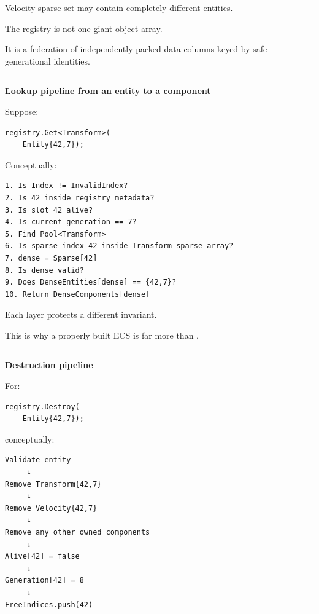 Velocity sparse set may contain completely different entities.

The registry is not one giant object array.

It is a federation of independently packed data columns keyed by safe generational identities.

\begin{center}\rule{0.5\linewidth}{0.5pt}\end{center}

\textbf{Lookup pipeline from an entity to a component}

Suppose:

\begin{verbatim}
registry.Get<Transform>(
    Entity{42,7});
\end{verbatim}

Conceptually:

\begin{verbatim}
1. Is Index != InvalidIndex?
2. Is 42 inside registry metadata?
3. Is slot 42 alive?
4. Is current generation == 7?
5. Find Pool<Transform>
6. Is sparse index 42 inside Transform sparse array?
7. dense = Sparse[42]
8. Is dense valid?
9. Does DenseEntities[dense] == {42,7}?
10. Return DenseComponents[dense]
\end{verbatim}

Each layer protects a different invariant.

This is why a properly built ECS is far more than .

\begin{center}\rule{0.5\linewidth}{0.5pt}\end{center}

\textbf{Destruction pipeline}

For:

\begin{verbatim}
registry.Destroy(
    Entity{42,7});
\end{verbatim}

conceptually:

\begin{verbatim}
Validate entity
     ↓
Remove Transform{42,7}
     ↓
Remove Velocity{42,7}
     ↓
Remove any other owned components
     ↓
Alive[42] = false
     ↓
Generation[42] = 8
     ↓
FreeIndices.push(42)
\end{verbatim}

